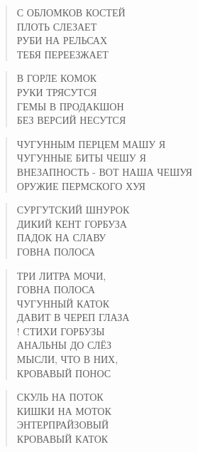 \poemtitle{***}
\begin{verse}
С ОБЛОМКОВ КОСТЕЙ\\
ПЛОТЬ СЛЕЗАЕТ\\
РУБИ НА РЕЛЬСАХ\\
ТЕБЯ ПЕРЕЕЗЖАЕТ
\end{verse}

\poemtitle{***}
\begin{verse}
В ГОРЛЕ КОМОК\\
РУКИ ТРЯСУТСЯ\\
ГЕМЫ В ПРОДАКШОН\\
БЕЗ ВЕРСИЙ НЕСУТСЯ
\end{verse}

\poemtitle{***}
\begin{verse}
ЧУГУННЫМ ПЕРЦЕМ МАШУ Я\\
ЧУГУННЫЕ БИТЫ ЧЕШУ Я\\
ВНЕЗАПНОСТЬ - ВОТ НАША ЧЕШУЯ\\
ОРУЖИЕ ПЕРМСКОГО ХУЯ
\end{verse}

\poemtitle{***}
\begin{verse}
СУРГУТСКИЙ ШНУРОК\\
ДИКИЙ КЕНТ ГОРБУЗА\\
ПАДОК НА СЛАВУ\\
ГОВНА ПОЛОСА
\end{verse}

\poemtitle{***}
\begin{verse}
ТРИ ЛИТРА МОЧИ, \\
ГОВНА ПОЛОСА\\
ЧУГУННЫЙ КАТОК \\
ДАВИТ В ЧЕРЕП ГЛАЗА\\!
СТИХИ ГОРБУЗЫ\\
АНАЛЬНЫ ДО СЛЁЗ\\
МЫСЛИ, ЧТО В НИХ,\\
КРОВАВЫЙ ПОНОС
\end{verse}

\poemtitle{***}
\begin{verse}
СКУЛЬ НА ПОТОК\\
КИШКИ НА МОТОК\\
ЭНТЕРПРАЙЗОВЫЙ\\
КРОВАВЫЙ КАТОК
\end{verse}

